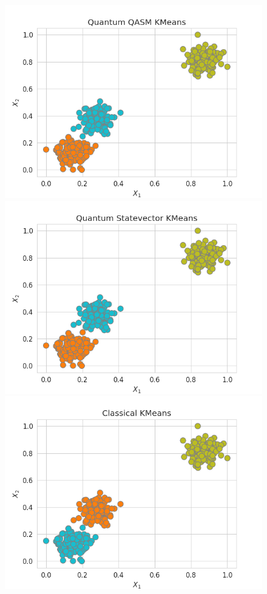 \documentclass{article}
\begin{document}
\begin{multicols}{2}
\begin{figure}[H]
  \centering
    \includegraphics[width=\linewidth]{assets/kmeans/Quantum QASM KMeans.png}
    \includegraphics[width=\linewidth]{assets/kmeans/Quantum Statevector KMeans.png}
  \includegraphics[width=\linewidth]{assets/kmeans/Classical KMeans.png}

\end{figure}
\end{multicols}
\end{document}

